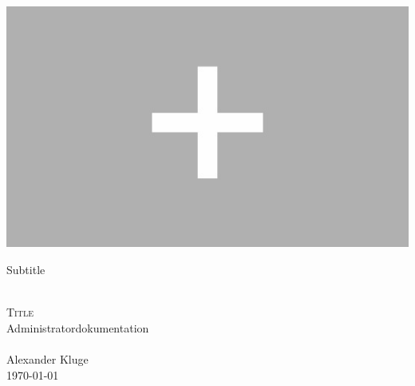 
\begin{titlepage}
   \parbox[]{\linewidth}{
      \centerline{
         \includegraphics[width=0.5\linewidth]{images/brands/platzhalter.jpg}
      }
      \centerline{Subtitle}
   }
   
   \mbox{}\vspace{5\baselineskip}\\
   \rmfamily\huge
   \centering
   \textsc{Title}
   \\[2ex]
   Administratordokumentation
   \rmfamily\Large
   \vspace{1\baselineskip}\\
   \mbox{}
   \vspace{5\baselineskip}\\
   \rmfamily\Large
   Alexander Kluge
   \vspace{1\baselineskip}\\
   \today
\end{titlepage}